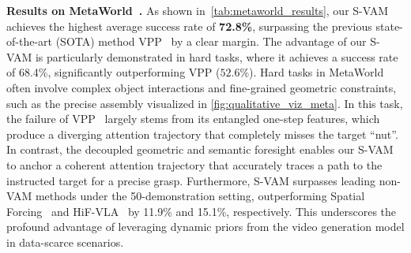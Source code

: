 \noindent \textbf{Results on MetaWorld~\cite{yu2020meta}.} 
As shown in~\cref{tab:metaworld_results}, our S-VAM achieves the highest average success rate of \textbf{72.8\%}, surpassing the previous state-of-the-art (SOTA) method VPP~\cite{huvideo} by a clear margin. The advantage of our S-VAM is particularly demonstrated in hard tasks, where it achieves a success rate of 68.4\%, significantly outperforming VPP ($52.6\%$). Hard tasks in MetaWorld often involve complex object interactions and fine-grained geometric constraints, such as the precise assembly visualized in \cref{fig:qualitative_viz_meta}. In this task, the failure of VPP~\cite{huvideo} largely stems from its entangled one-step features, which produce a diverging attention trajectory that completely misses the target ``nut''. In contrast, the decoupled geometric and semantic foresight enables our S-VAM to anchor a coherent attention trajectory that accurately traces a path to the instructed target for a precise grasp. Furthermore, S-VAM surpasses leading non-VAM methods under the 50-demonstration setting, outperforming Spatial Forcing~\cite{li2025spatial} and HiF-VLA~\cite{lin2025hif} by 11.9\% and 15.1\%, respectively. This underscores the profound advantage of leveraging dynamic priors from the video generation model in data-scarce scenarios.



